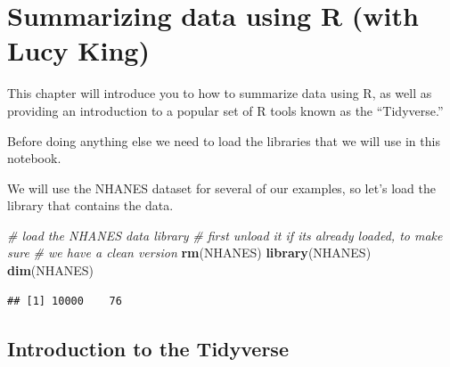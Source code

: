 \documentclass[
  12pt,
]{book}
\newenvironment{Shaded}{\begin{snugshade}}{\end{snugshade}}
\newcommand{\AttributeTok}[1]{\textcolor[rgb]{0.13,0.29,0.53}{#1}}
\newcommand{\CommentTok}[1]{\textcolor[rgb]{0.56,0.35,0.01}{\textit{#1}}}
\newcommand{\DecValTok}[1]{\textcolor[rgb]{0.00,0.00,0.81}{#1}}
\newcommand{\FunctionTok}[1]{\textcolor[rgb]{0.13,0.29,0.53}{\textbf{#1}}}
\newcommand{\NormalTok}[1]{#1}
\newcommand{\SpecialCharTok}[1]{\textcolor[rgb]{0.81,0.36,0.00}{\textbf{#1}}}
\newcommand{\StringTok}[1]{\textcolor[rgb]{0.31,0.60,0.02}{#1}}
\begin{document}
\hypertarget{summarizing-data}{%
\chapter{Summarizing data using R (with Lucy King)}\label{summarizing-data}}

This chapter will introduce you to how to summarize data using R, as well as providing an introduction to a popular set of R tools known as the ``Tidyverse.''

Before doing anything else we need to load the libraries that we will use in this notebook.

\begin{Shaded}
\end{Shaded}

We will use the NHANES dataset for several of our examples, so let's load the library that contains the data.

\begin{Shaded}
\begin{Highlighting}[]
\CommentTok{\# load the NHANES data library}
\CommentTok{\# first unload it if it\textquotesingle{}s already loaded, to make sure}
\CommentTok{\# we have a clean version}
\FunctionTok{rm}\NormalTok{(}\StringTok{\textquotesingle{}NHANES\textquotesingle{}}\NormalTok{)}
\FunctionTok{library}\NormalTok{(NHANES)}
\FunctionTok{dim}\NormalTok{(NHANES)}
\end{Highlighting}
\end{Shaded}

\begin{verbatim}
## [1] 10000    76
\end{verbatim}

\hypertarget{introduction-to-the-tidyverse}{%
\section{Introduction to the Tidyverse}\label{introduction-to-the-tidyverse}}
\end{document}
